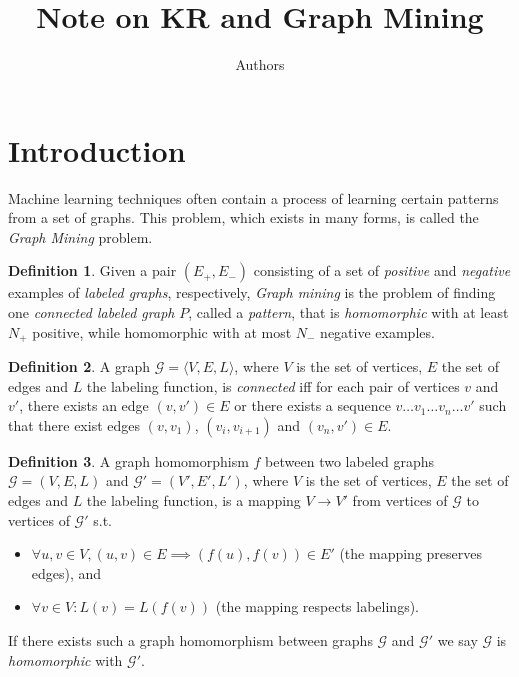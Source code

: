 \documentclass{article}
\author{Authors}
\title{Note on KR and Graph Mining}
\theoremstyle{definition}
\newtheorem{definition}{Definition}[section]
\newcommand{\triple}[1]{\ensuremath{\langle #1 \rangle}}
\newcommand{\pair}[1]{\ensuremath{\left(#1\right)}}
\newcommand{\graph}[1]{\ensuremath{\mathcal{#1}}}
\begin{document}
\maketitle

\section{Introduction}

Machine learning techniques often contain a process of learning certain patterns from a set of graphs.
This problem, which exists in many forms, is called the \emph{Graph Mining} problem.

\begin{definition}
\label{def:GM1}
Given a pair $\pair{E_{+},E_{-}}$ consisting of a set of \emph{positive} and \emph{negative} examples of \emph{labeled graphs}, respectively,
\emph{Graph mining} is the problem of finding one \emph{connected labeled graph} $P$, called a \emph{pattern},
that is \emph{homomorphic} with at least $N_{+}$ positive, while homomorphic with at most $N_{-}$ negative examples.
\end{definition}

\begin{definition}
A graph $\graph{G} = \triple{V,E,L}$, where $V$ is the set of vertices, $E$ the set of edges and $L$ the labeling function, is \emph{connected} iff for each pair of vertices $v$ and $v'$, there exists an edge $\pair{v,v'} \in E$ or there exists a sequence $v \ldots v_{1} \ldots v_{n} \ldots v'$ such that there exist edges $\pair{v,v_{1}}$, $\pair{v_{i},v_{i+1}}$ and $\pair{v_{n},v'} \in E$.
\end{definition}


\begin{definition}
A graph homomorphism $f$ between two labeled graphs $\graph{G} = (V,E,L)$ and $\graph{G'} = (V',E',L')$, where $V$ is the set of vertices, $E$ the set of edges and $L$ the labeling function, is a mapping $V \rightarrow V'$ from vertices of $\graph{G}$ to vertices of $\graph{G'}$ s.t. 
\begin{itemize}
\item $\forall u,v \in V, \pair{u,v} \in E \implies \pair{f(u),f(v)} \in E'$ (the mapping preserves edges), and 
\item $\forall v \in V : L(v) = L(f(v))$ (the mapping respects labelings).
\end{itemize}
If there exists such a graph homomorphism between graphs $\graph{G}$ and $\graph{G'}$ we say $\graph{G}$ is \emph{homomorphic} with $\graph{G'}$.
\end{definition}
\end{document}
